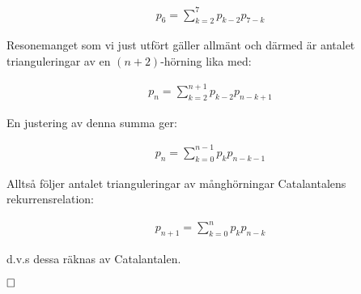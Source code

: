 \documentclass{tufte-handout}
\begin{document}
\begin{ans}
    \vspace{-2mm}
    
    \begin{align*}
        p_6 = \sum_{k = 2}^{7} p_{k - 2} p_{7 - k}
    \end{align*}

    Resonemanget som vi just utfört gäller allmänt och därmed är antalet trianguleringar av en $(n + 2)$-hörning lika med:

    \vspace{-2mm}
    
    \begin{align*}
        p_{n} = \sum_{k = 2}^{n + 1} p_{k - 2} p_{n - k + 1}
    \end{align*}

    En justering av denna summa ger:

    \vspace{-2mm}
    
    \begin{align*}
        p_{n} = \sum_{k = 0}^{n - 1} p_k p_{n - k - 1}
    \end{align*}

    Alltså följer antalet trianguleringar av månghörningar Catalantalens rekurrensrelation:

    \vspace{-2mm}
    
    \begin{align*}
        p_{n + 1} = \sum_{k = 0}^n p_k p_{n - k}
    \end{align*}

    d.v.s dessa räknas av Catalantalen.

    $\hfill \square$
\end{ans}
\end{document}
